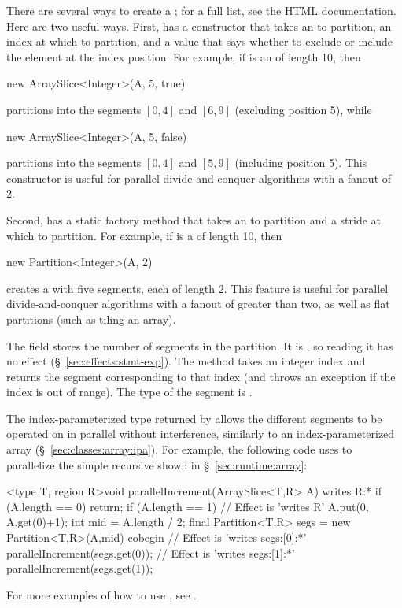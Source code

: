  There are several ways to
create a ; for a full list, see the HTML
documentation.  Here are two useful ways.  First, 
has a constructor that takes an  to partition, an index
at which to partition, and a  value that says whether to
exclude or include the element at the index position.  For example, if
 is an  of length 10, then
%
\begin{dpjlisting}
new ArraySlice<Integer>(A, 5, true)
\end{dpjlisting}
%
partitions  into the segments $[0,4]$ and $[6,9]$ (excluding
position 5), while
%
\begin{dpjlisting}
new ArraySlice<Integer>(A, 5, false)
\end{dpjlisting}
%
partitions  into the segments $[0,4]$ and $[5,9]$ (including
position 5).  This constructor is useful for parallel
divide-and-conquer algorithms with a fanout of 2.

Second,  has a static factory method
 that takes an  to partition and a
stride at which to partition.  For example, if  is a
 of length 10, then
%
\begin{dpjlisting}
new Partition<Integer>(A, 2)
\end{dpjlisting}
%
creates a  with five segments, each of
length 2.  This feature is useful for parallel divide-and-conquer
algorithms with a fanout of greater than two, as well as flat
partitions (such as tiling an array).

 The field  stores the number
of segments in the partition.  It is , so reading it has no
effect (\S~\ref{sec:effects:stmt-exp}).  The method  takes an
integer index  and returns the segment corresponding to that
index (and throws an exception if the index is out of range).  The
type of the segment is .

The index-parameterized type returned by  allows the
different segments to be operated on in parallel without interference,
similarly to an index-parameterized array
(\S~\ref{sec:classes:array:ipa}).  For example, the following code uses
 to parallelize the simple recursive 
shown in \S~\ref{sec:runtime:array}:
%
\begin{dpjlisting}
<type T, region R>void parallelIncrement(ArraySlice<T,R> A) 
  writes R:* {
    if (A.length == 0) return;
    if (A.length == 1) {
        // Effect is 'writes R'
        A.put(0, A.get(0)+1);
    }
    int mid = A.length / 2;
    final Partition<T,R> segs = new Partition<T,R>(A,mid)
    cobegin {
        // Effect is 'writes segs:[0]:*'
        parallelIncrement(segs.get(0));
        // Effect is 'writes segs:[1]:*'
        parallelIncrement(segs.get(1));
    }
}
\end{dpjlisting}
%
For more examples of how to use , see \tutorial.

